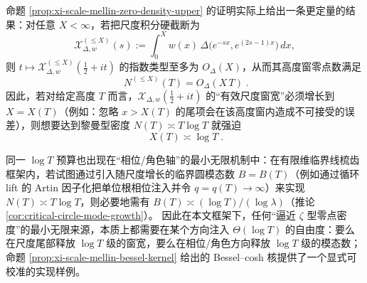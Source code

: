 \begin{remark}\label{rem:xi-scale-mellin-logT-budget}
命题 \ref{prop:xi-scale-mellin-zero-density-upper} 的证明实际上给出一条更定量的结果：对任意 \(X<\infty\)，若把尺度积分硬截断为
\[
\mathcal X_{\Delta,w}^{(\le X)}(s):=\int_{0}^{X} w(x)\,\Delta\!\bigl(e^{-sx},e^{(2s-1)x}\bigr)\,dx,
\]
则 \(t\mapsto \mathcal X_{\Delta,w}^{(\le X)}(\tfrac12+it)\) 的指数类型至多为 \(O_\Delta(X)\)，从而其高度窗零点数满足
\[
\boxed{\;N^{(\le X)}(T)=O_\Delta(X\,T)\; }.
\]
因此，若对给定高度 \(T\) 而言，\(\mathcal X_{\Delta,w}(\tfrac12+it)\) 的“有效尺度窗宽”必须增长到 \(X=X(T)\)（例如：忽略 \(x>X(T)\) 的尾项会在该高度窗内造成不可接受的误差），则想要达到黎曼型密度 \(N(T)\asymp T\log T\) 就强迫
\[
\boxed{\;X(T)\asymp \log T\; }.
\]
\par
同一 \(\log T\) 预算也出现在“相位/角色轴”的最小无限机制中：在有限维临界线梳齿框架内，若试图通过引入随尺度增长的临界圆模态数 \(B=B(T)\)（例如通过循环 lift 的 Artin 因子化把单位根相位注入并令 \(q=q(T)\to\infty\)）来实现 \(N(T)\asymp T\log T\)，则必要地需有 \(B(T)\asymp (\log T)/(\log\lambda)\)（推论 \ref{cor:critical-circle-mode-growth}）。
因此在本文框架下，任何“逼近 \(\zeta\) 型零点密度”的最小无限来源，本质上都需要在某个方向注入 \(\Theta(\log T)\) 的自由度：要么在尺度尾部释放 \(\log T\) 级的窗宽，要么在相位/角色方向释放 \(\log T\) 级的模态数；命题 \ref{prop:xi-scale-mellin-bessel-kernel} 给出的 Bessel--cosh 核提供了一个显式可校准的实现样例。
\end{remark}

